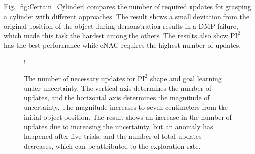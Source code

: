 \documentclass[letterpaper, 10 pt, conference]{ieeeconf}  %
\begin{document}
Fig. \ref{fig:Certain_Cylinder} compares the number of required updates for grasping a cylinder with different approaches. The result shows a small deviation from the original position of the object during demonstration results in a DMP failure, which made this task the hardest among the others. The results also show $\textrm{PI}^2$ has the best performance while eNAC requires the highest number of updates.


\begin{figure}[]
    \centering
     \resizebox {\linewidth} {!} {
    
    }
    \caption[The number of necessary updates for $\textrm{PI}^2$ shape and goal learning under uncertainty.]{The number of necessary updates for $\textrm{PI}^2$ shape and goal learning under uncertainty. The vertical axis determines the number of updates, and the horizontal axis determines the magnitude of uncertainty. The magnitude increases to seven centimeters from the initial object position. The result shows an increase in the number of updates due to increasing the uncertainty, but an anomaly has happened after five trials, and the number of total updates decreases, which can be attributed to the exploration rate.  }
    \label{fig:Uncertainty_Num}
\vspace{-6mm}
\end{figure}
\end{document}
